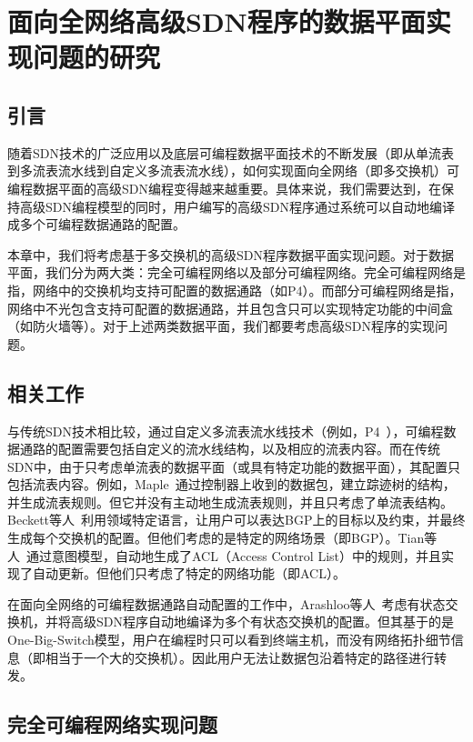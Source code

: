 \chapter{面向全网络高级SDN程序的数据平面实现问题的研究}

\section{引言}

随着SDN技术的广泛应用以及底层可编程数据平面技术的不断发展（即从单流表到多流表流水线到自定义多流表流水线），如何实现面向全网络（即多交换机）可编程数据平面的高级SDN编程变得越来越重要。具体来说，我们需要达到，在保持高级SDN编程模型的同时，用户编写的高级SDN程序通过系统可以自动地编译成多个可编程数据通路的配置。

本章中，我们将考虑基于多交换机的高级SDN程序数据平面实现问题。对于数据平面，我们分为两大类：完全可编程网络以及部分可编程网络。完全可编程网络是指，网络中的交换机均支持可配置的数据通路（如P4）。而部分可编程网络是指，网络中不光包含支持可配置的数据通路，并且包含只可以实现特定功能的中间盒（如防火墙等）。对于上述两类数据平面，我们都要考虑高级SDN程序的实现问题。

\section{相关工作}

与传统SDN技术相比较，通过自定义多流表流水线技术（例如，P4~\cite{P4}），可编程数据通路的配置需要包括自定义的流水线结构，以及相应的流表内容。而在传统SDN中，由于只考虑单流表的数据平面（或具有特定功能的数据平面），其配置只包括流表内容。例如，Maple~\cite{voellmy2013maple}通过控制器上收到的数据包，建立踪迹树的结构，并生成流表规则。但它并没有主动地生成流表规则，并且只考虑了单流表结构。Beckett等人~\cite{beckett2016don}利用领域特定语言，让用户可以表达BGP上的目标以及约束，并最终生成每个交换机的配置。但他们考虑的是特定的网络场景（即BGP）。Tian等人~\cite{tian2019safely}通过意图模型，自动地生成了ACL（Access Control List）中的规则，并且实现了自动更新。但他们只考虑了特定的网络功能（即ACL）。

在面向全网络的可编程数据通路自动配置的工作中，Arashloo等人~\cite{snap}考虑有状态交换机，并将高级SDN程序自动地编译为多个有状态交换机的配置。但其基于的是One-Big-Switch模型，用户在编程时只可以看到终端主机，而没有网络拓扑细节信息（即相当于一个大的交换机）。因此用户无法让数据包沿着特定的路径进行转发。

\section{完全可编程网络实现问题}

